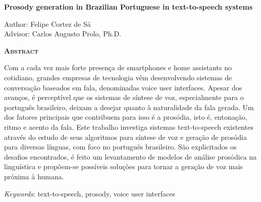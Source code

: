 \begin{center}
	{\Large{\textbf{Prosody generation in Brazilian Portuguese in text-to-speech systems}}}
\end{center}

\vspace{1cm}

\begin{flushright}
	Author: Felipe Cortez de Sá \\
	Advisor: Carlos Augusto Prolo, Ph.D.
\end{flushright}

\vspace{1cm}

\begin{center}
	\Large{\textsc{\textbf{Abstract}}}
\end{center}

\noindent Com a cada vez mais forte presença de smartphones e home assistants no cotidiano, grandes empresas de tecnologia vêm desenvolvendo sistemas de conversação baseados em fala, denominadas voice user interfaces. Apesar dos avanços, é perceptível que os sistemas de síntese de voz, especialmente para o português brasileiro, deixam a desejar quanto à naturalidade da fala gerada. Um dos fatores principais que contribuem para isso é a prosódia, isto é, entonação, ritmo e acento da fala. Este trabalho investiga sistemas text-to-speech existentes através do estudo de seus algoritmos para síntese de voz e geração de prosódia para diversas línguas, com foco no português brasileiro. São explicitados os desafios encontrados, é feito um levantamento de modelos de análise prosódica na linguística e propõem-se possíveis soluções para tornar a geração de voz mais próxima à humana.

\noindent\textit{Keywords}: text-to-speech, prosody, voice user interfaces
